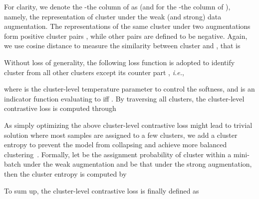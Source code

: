 For clarity, we denote the -the column of  as  (and  for the -the column of ), namely, the representation of cluster  under the weak (and strong) data augmentation. The representations of the same cluster under two augmentations form positive cluster pairs , while other pairs are defined to be negative. Again, we use cosine distance to measure the similarity between cluster  and , that is


Without loss of generality, the following loss function is adopted to identify cluster  from all other  clusters except its counter part , \textit{i.e.},

where  is the cluster-level temperature parameter to control the softness, and  is an indicator function evaluating to  iff . By traversing all clusters, the cluster-level contrastive loss is computed through


As simply optimizing the above cluster-level contrastive loss might lead to trivial solution where most samples are assigned to a few clusters, we add a cluster entropy to prevent the model from collapsing and achieve more balanced clustering~\citep{ghasedi2017deep, PICA}. Formally, let  be the assignment probability of cluster  within a mini-batch under the weak augmentation and  be that under the strong augmentation, then the cluster entropy is computed by


To sum up, the cluster-level contrastive loss is finally defined as


